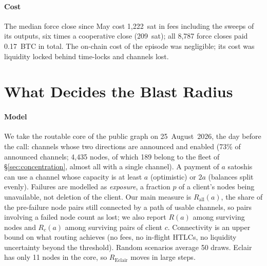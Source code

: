 \documentclass[conference]{IEEEtran}
\begin{document}
\paragraph*{Cost}
The median force close since May cost 1,222~sat in fees including the sweeps of its outputs, six times a
cooperative close (209~sat); all 8,787 force closes paid 0.17~BTC in total. The on-chain cost of the episode was
negligible; its cost was liquidity locked behind time-locks and channels lost.




\section{What Decides the Blast Radius}
\label{sec:resilience}

\paragraph*{Model}
We take the routable core of the public graph on 25~August~2026, the day before the call: channels whose two
directions are announced and enabled (73\% of announced channels; 4,435 nodes, of which 189 belong to the fleet
of \S\ref{sec:concentration}, almost all with a single channel). A payment of $a$ satoshis can
use a channel whose capacity is at least $a$ (optimistic) or $2a$ (balances split evenly). Failures are modelled as
\emph{exposure}, a fraction $p$ of a client's nodes being unavailable, not deletion of the client. Our main
measure is $R_{\mathrm{all}}(a)$, the share of the pre-failure node pairs still connected by a path of usable
channels, so pairs involving a failed node count as lost; we also report $R(a)$ among surviving nodes and
$R_c(a)$ among surviving pairs of client $c$. Connectivity is an upper bound on what routing achieves (no fees, no
in-flight HTLCs, no liquidity uncertainty beyond the threshold). Random scenarios average 50 draws. Eclair has
only 11 nodes in the core, so $R_{\mathrm{Eclair}}$ moves in large steps.
\end{document}
